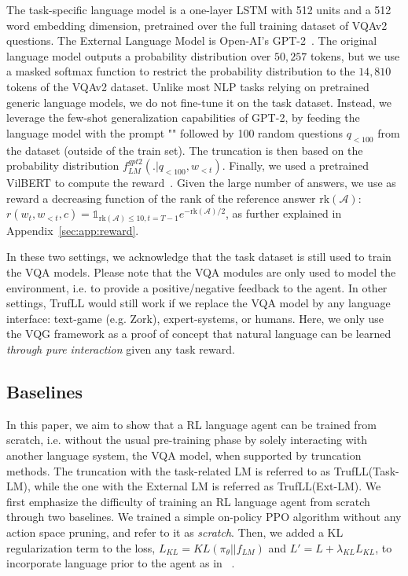 \documentclass{article}
\newcommand{\params}{\theta}
\newcommand{\policy}{\pi_{\params}}
\newcommand{\answer}{\mathcal{A}}
\newcommand{\algo}{TrufLL\xspace}
\newcommand{\indicatrice}[1]{\mathds{1}_{#1}}
\begin{document}
The task-specific language model is a one-layer LSTM with 512 units and a 512 word embedding dimension, pretrained over the full training dataset of VQAv2 questions. The External Language Model is Open-AI's GPT-2~\citep{radford2019language}. The original language model outputs a probability distribution over $50,257$ tokens, but we use a masked softmax function to restrict the probability distribution to the $14,810$ tokens of the VQAv2 dataset. Unlike most NLP tasks relying on pretrained generic language models, we do not fine-tune it on the task dataset. Instead, we leverage the few-shot generalization capabilities of GPT-2,  by feeding the language model with the prompt "" followed by 100 random questions $q_{<100}$ from the dataset (outside of the train set). The truncation is then based on 
the probability distribution $f^{gpt2}_{LM}(.|q_{<100}, w_{<t})$.
%
Finally, we used a pretrained VilBERT to compute the reward~\citep{Lu_2020_CVPR}.
Given the large number of answers, we use as reward a decreasing function of the rank of the reference answer $\mathrm{rk}(\answer)$:
$r(w_t, w_{<t}, c) = \indicatrice{\mathrm{rk}(\answer)\leq 10, t=T-1}e^{-\mathrm{rk}(\answer)/2}$, as further explained in Appendix~\ref{sec:app:reward}. 


In these two settings, we acknowledge that the task dataset is still used to train the VQA models. Please note that the VQA modules are only used to model the environment, i.e. to provide a positive/negative feedback to the agent. In other settings, \algo would still work if we replace the VQA model by any language interface: text-game (e.g. Zork), expert-systems, or humans. Here, we only use the VQG framework as a proof of concept that natural language can be learned \emph{through pure interaction} given any task reward.


\subsection{Baselines}
\label{subsec:baseline} 

In this paper, we aim to show that a RL language agent can be trained from scratch, i.e. without the usual pre-training phase 
by solely interacting with another language system, the VQA model, when supported by truncation methods. 
The truncation with the task-related LM is referred to as \algo(Task-LM), while the one with the External LM is referred as \algo(Ext-LM). We first emphasize the difficulty of training an RL language agent from scratch through two baselines. We trained a simple on-policy PPO algorithm without any action space pruning, and refer to it as \textit{scratch}. Then, we added a KL regularization term to the loss, $L_{KL}=KL(\policy||f_{LM})$ and $L'=L+\lambda_{KL}L_{KL}$, to incorporate language prior to the agent as in ~\citep{jaques2017sequence,jaques2019way}.
\end{document}
